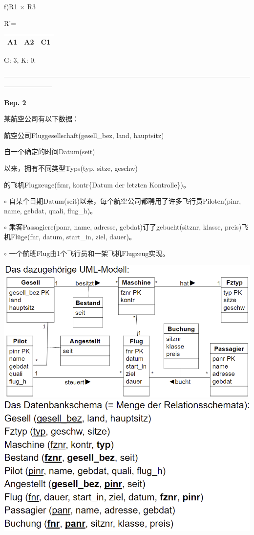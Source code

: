 \documentclass[fleqn]{article}
\begin{document}
f)R1 $\times$ R3

\begin{center}
    R'=\begin{tabular}{|c|c|c|}
        \hline
        A1&A2&C1\\
        \hline
    \end{tabular}

    G: 3, K: 0.
\end{center}

\noindent---------------------------------------------------------------------------------------------------------------------------------

\noindent\textbf{Bep. 2}

某航空公司有以下数据：

航空公司Fluggesellschaft(gesell\_bez, land, hauptsitz)

自一个确定的时间Datum(seit)

以来，拥有不同类型Typs(typ, sitze, geschw)

的飞机Flugzeuge(fznr, kontr\{Datum der letzten Kontrolle\})。

$\circ$ 自某个日期Datum(seit)以来，每个航空公司都聘用了许多飞行员Piloten(pinr, name, gebdat, quali, flug\_h)。

$\circ$ 乘客Passagiere(panr, name, adresse, gebdat)订了gebucht(sitznr, klasse, preis)飞机Flüge(fnr, datum, start\_in, ziel, dauer)。

$\circ$ 一个航班Flug由1个飞行员和一架飞机Flugzeug实现。

\begin{center}
    \includegraphics[scale=0.5]{20.png}
    \includegraphics[scale=0.5]{21.png}
\end{center}
\end{document}
